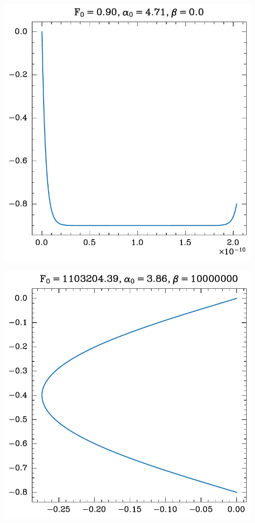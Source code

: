 \begin{center}
    \begin{minipage}{0.5\textwidth}
        \centering
    \includegraphics[width=\textwidth]{../images/2024-1-trajektorija_limit_beta0.pdf}
    \end{minipage}\hfill
    \begin{minipage}{0.5\textwidth}
        \centering
        \includegraphics[width=1\textwidth]{../images/2024-1-trajektorija_limit_betainf.pdf}
    \end{minipage}
\end{center}

